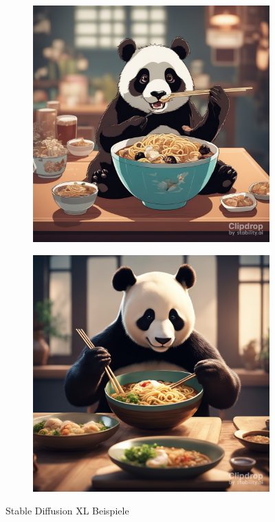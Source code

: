 \begin{figure}[!htb]
\begin{subfigure}[h]{0.22\textwidth}
\end{subfigure}
\begin{subfigure}[h]{0.22\textwidth}
  \centering
  \includegraphics[width=\linewidth]{figures/stable_diff/p3.jpg}
\end{subfigure}
\begin{subfigure}[h]{0.22\textwidth}
  \centering
  \includegraphics[width=\linewidth]{figures/stable_diff/p1.jpg}
\end{subfigure}
\caption{Stable Diffusion XL Beispiele}
\label{fig:stable_diff}
\end{figure}

